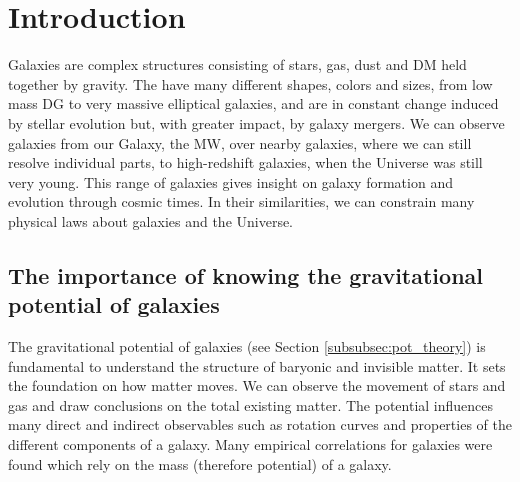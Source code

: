 \section{Introduction}\label{sec:Intro}
Galaxies are complex structures consisting of stars, gas, dust and \ac{DM} held together by gravity. The have many different shapes, colors and sizes, from low mass \ac{DG} to very massive elliptical galaxies, and are in constant change induced by stellar evolution but, with greater impact, by galaxy mergers. We can observe galaxies from our Galaxy, the \ac{MW}, over nearby galaxies, where we can still resolve individual parts, to high-redshift galaxies, when the Universe was still very young. This range of galaxies gives insight on galaxy formation and evolution through cosmic times. In their similarities, we can constrain many physical laws about galaxies and the Universe. 

\subsection{The importance of knowing the gravitational potential of galaxies}
The gravitational potential of galaxies (see Section \ref{subsubsec:pot_theory}) is fundamental to understand the structure of baryonic and invisible matter. It sets the foundation on how matter moves. We can observe the movement of stars and gas and draw conclusions on the total existing matter. The potential influences many direct and indirect observables such as rotation curves and properties of the different components of a galaxy. Many empirical correlations for galaxies were found which rely on the mass (therefore potential) of a galaxy. 

